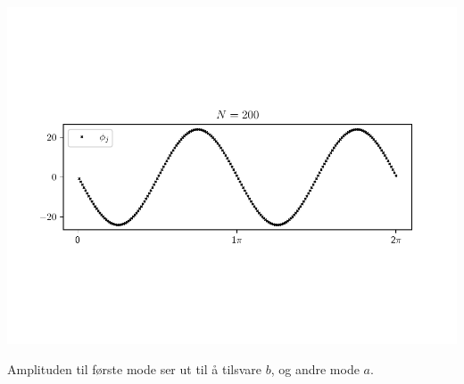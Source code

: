 \begin{Figure}
    \centering
    \captionsetup{type = figure}
    \includegraphics[width = \textwidth]{phi6_a10_b1_N200.pdf}
    \label{fig:phi6_a10_b1_N200}
\end{Figure}

\noindent Amplituden til første mode ser ut til å tilsvare $b$, og andre mode $a$.